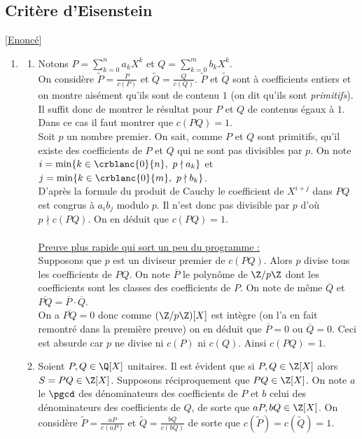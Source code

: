 \documentclass{book}
\begin{document}
	\subsection{Critère d'Eisenstein }
	\label{sec:critere-deisenstein-etoile3}
	\textcolor{blue}{\hyperref[Eisenstein]{[Enoncé]}}\\
	\begin{enumerate}[leftmargin=*]
		\item
		\begin{enumerate}[label=\alph*.]
			\item Notons $P=\displaystyle\sum_{k=0}^na_kX^k$ et $Q=\displaystyle\sum_{k=0}^mb_kX^k$.\\
			On considère $\tilde P=\displaystyle\frac{P}{c(P)}$ et $\tilde Q=\displaystyle\frac{Q}{c(Q)}$. $\tilde P$ et $\tilde Q$ sont à coefficients entiers et on montre aisément qu'ils sont de contenu $1$ (on dit qu'ils sont \textit{primitifs}). Il suffit donc de montrer le résultat pour $P$ et $Q$ de contenus égaux à $1$. Dans ce cas il faut montrer que $c(PQ)=1$.\\
			Soit $p$ un nombre premier. On sait, comme $P$ et $Q$ sont primitifs, qu'il existe des coefficients de $P$ et $Q$ qui ne sont pas divisibles par $p$. On note $i=\min\{k\in \crblanc{0}{n},\ p\nmid a_k\}$ et $j=\min\{k\in \crblanc{0}{m},\ p\nmid b_k\}$.\\
			D'après la formule du produit de Cauchy le coefficient de $X^{i+j}$ dans $PQ$ est congrus à $a_ib_j$ modulo $p$. Il n'est donc pas divisible par $p$ d'où $p\nmid c(PQ)$. On en déduit que $c(PQ)=1$.\\\\
			\underline{Preuve plus rapide qui sort un peu du programme :}\\
			Supposons que $p$ est un diviseur premier de $c(PQ)$. Alors $p$ divise tous les coefficients de $PQ$. On note $\overline P$ le polynôme de $\Z/p\Z$ dont les coefficients sont les classes des coefficients de $P$. On note de même $\overline Q$ et $\overline{PQ}=\overline P\cdot\overline Q$.\\
			On a $\overline{PQ}=0$ donc comme $(\Z/p\Z)[X]$ est intègre (on l'a en fait remontré dans la première preuve) on en déduit que $\overline P=0$ ou $\overline Q=0$. Ceci est absurde car $p$ ne divise ni $c(P)$ ni $c(Q)$. Ainsi $c(PQ)=1$.
			\item Soient $P,Q\in \Q[X]$ unitaires. Il est évident que si $P,Q\in \Z[X]$ alors $S=PQ\in \Z[X]$. Supposons réciproquement que $PQ\in \Z[X]$. On note $a$ le $\pgcd$ des dénominateurs des coefficients de $P$ et $b$ celui des dénominateurs des coefficients de $Q$, de sorte que $aP,bQ\in \Z[X]$. On considère $\tilde P=\displaystyle\frac{aP}{c(aP)}$ et $\tilde Q=\displaystyle\frac{bQ}{c(bQ)}$ de sorte que $c(\tilde P)=c(\tilde Q)=1$.\\

\end{enumerate}
\end{enumerate}
\end{document}
